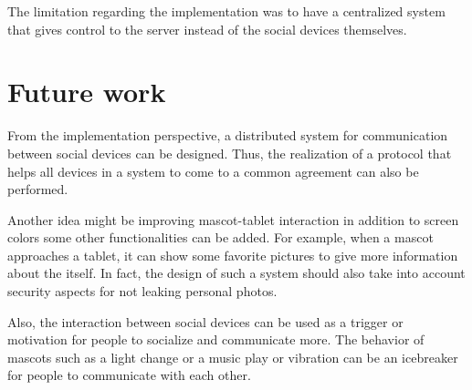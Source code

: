The limitation regarding the implementation was to have a centralized system that gives
control to the server instead of the social devices themselves.

\section{Future work}
\label{sec:future-work}
From the implementation perspective, a distributed system for communication between
social devices can be designed.
Thus, the realization of a protocol that helps all devices in a system to come to a
common agreement can also be performed.

Another idea might be improving mascot-tablet interaction in addition to screen colors
some other functionalities can be added.
For example, when a mascot approaches a tablet, it can show some favorite pictures
to give more information about the itself.
In fact, the design of such a system should also take into account security aspects for not leaking personal photos.

Also, the interaction between social devices can be used as a trigger or
motivation for people to socialize and communicate more.
The behavior of mascots such as a light change or a music play or vibration can be an icebreaker for people to communicate with each other.